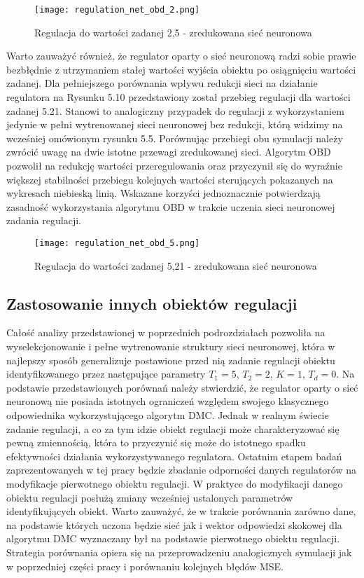 \begin{figure}[!h]
  \label{fig:Regulation-OBD-2}
  \centering \texttt{[image: regulation\_net\_obd\_2.png]}
  \caption{Regulacja do wartości zadanej 2,5 - zredukowana sieć neuronowa}
\end{figure}

\par Warto zauważyć również, że regulator oparty o sieć neuronową radzi sobie prawie bezbłędnie z utrzymaniem stałej wartości wyjścia obiektu po osiągnięciu wartości zadanej. Dla pełniejszego porównania wpływu redukcji sieci na działanie regulatora na Rysunku 5.10 przedstawiony został przebieg regulacji dla wartości zadanej 5.21. Stanowi to analogiczny przypadek do regulacji z wykorzystaniem jedynie w pełni wytrenowanej sieci neuronowej bez redukcji, którą widzimy na wcześniej omówionym rysunku 5.5. Porównując przebiegi obu symulacji należy zwrócić uwagę na dwie istotne przewagi zredukowanej sieci. Algorytm OBD pozwolił na redukcję wartości przeregulowania oraz przyczynił się do wyraźnie większej stabilności przebiegu kolejnych wartości sterujących pokazanych na wykresach niebieską linią. Wskazane korzyści jednoznacznie potwierdzają zasadność wykorzystania algorytmu OBD w trakcie uczenia sieci neuronowej zadania regulacji.
 
\begin{figure}[!h]
  \label{fig:Regulation-OBD-5}
  \centering \texttt{[image: regulation\_net\_obd\_5.png]}
  \caption{Regulacja do wartości zadanej 5,21 - zredukowana sieć neuronowa}
\end{figure}

\subsection{Zastosowanie innych obiektów regulacji}

\par Całość analizy przedstawionej w poprzednich podrozdziałach pozwoliła na wyselekcjonowanie i pełne wytrenowanie struktury sieci neuronowej, która w najlepszy sposób generalizuje postawione przed nią zadanie regulacji obiektu identyfikowanego przez następujące parametry \( T_1=5, \, T_2=2, \, K=1, \, T_d=0 \). Na podstawie przedstawionych porównań należy stwierdzić, że regulator oparty o sieć neuronową nie posiada istotnych ograniczeń względem swojego klasycznego odpowiednika wykorzystującego algorytm DMC. Jednak w realnym świecie zadanie regulacji, a co za tym idzie obiekt regulacji może charakteryzować się pewną zmiennością, która to przyczynić się może do istotnego spadku efektywności działania wykorzystywanego regulatora. Ostatnim etapem badań zaprezentowanych w tej pracy będzie zbadanie odporności danych regulatorów na modyfikacje pierwotnego obiektu regulacji. W praktyce do modyfikacji danego obiektu regulacji posłużą zmiany wcześniej ustalonych parametrów identyfikujących obiekt. Warto zauważyć, że w trakcie porównania zarówno dane, na podstawie których uczona będzie sieć jak i wektor odpowiedzi skokowej dla algorytmu DMC wyznaczany był na podstawie pierwotnego obiektu regulacji. Strategia porównania opiera się na przeprowadzeniu analogicznych symulacji jak w poprzedniej części pracy i porównaniu kolejnych błędów MSE.   


